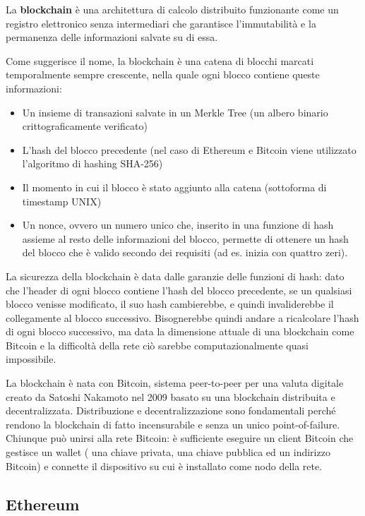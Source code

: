 La \textbf{blockchain} è una architettura di calcolo distribuito funzionante come un registro elettronico senza intermediari
che garantisce l’immutabilità e la permanenza delle informazioni salvate su di essa.

Come suggerisce il nome, la blockchain è una catena di blocchi marcati temporalmente sempre crescente,
nella quale ogni blocco contiene queste informazioni:

\begin{itemize}
    \item Un insieme di transazioni salvate in un Merkle Tree (un albero binario crittograficamente verificato)
    \item L'hash del blocco precedente (nel caso di Ethereum e Bitcoin viene utilizzato l'algoritmo di hashing SHA-256)
    \item Il momento in cui il blocco è stato aggiunto alla catena (sottoforma di timestamp UNIX)
    \item Un nonce, ovvero un numero unico che, inserito in una funzione di hash assieme al resto delle informazioni del blocco,
    permette di ottenere un hash del blocco che è valido secondo dei requisiti (ad es. inizia con quattro zeri).
\end{itemize}

La sicurezza della blockchain è data dalle garanzie delle funzioni di hash: dato che l'header di ogni blocco contiene
l'hash del blocco precedente, se un qualsiasi blocco venisse modificato, il suo hash cambierebbe, e quindi invaliderebbe 
il collegamente al blocco successivo. Bisognerebbe quindi andare a ricalcolare l'hash di ogni blocco successivo,
ma data la dimensione attuale di una blockchain come Bitcoin e la difficoltà della rete
ciò sarebbe computazionalmente quasi impossibile.

La blockchain è nata con Bitcoin, sistema peer-to-peer per una valuta digitale creato da Satoshi Nakamoto nel 2009
basato su una blockchain distribuita e decentralizzata. 
Distribuzione e decentralizzazione sono fondamentali perché rendono la blockchain di fatto incensurabile
e senza un unico point-of-failure. Chiunque può unirsi alla rete Bitcoin: è sufficiente eseguire un client Bitcoin che gestisce un wallet (
una chiave privata, una chiave pubblica ed un indirizzo Bitcoin) e connette il dispositivo su cui è installato come nodo della rete.

\subsection{Ethereum}

